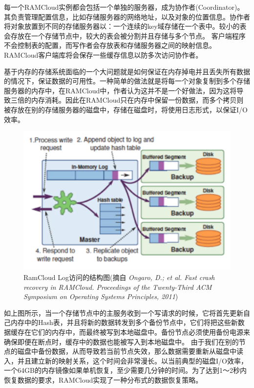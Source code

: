 每一个RAMCloud实例都会包括一个单独的服务器，成为协作者(Coordinator)。其负责管理配置信息，比如存储服务器的网络地址，以及对象的位置信息。协作者将对象放置到不同的存储服务器以：一个连续的key域存储在一个表中。较小的表会存放在一个存储节点中，较大的表会被分割并且存储与多个节点。 客户端程序不会控制表的配置，而写作者会存放表和存储服务器之间的映射信息。RAMCloud客户端库将会保存一些缓存信息以防多次访问协作者。

  基于内存的存储系统面临的一个大问题就是如何保证在内存掉电并且丢失所有数据的情况下，保证数据的可用性。一种简单的做法就是将每一个对象复制到多个存储服务器的内存中，在RAMCloud中，作者认为这并不是一个好做法，因为这将导致三倍的内存消耗。因此在RAMCloud只在内存中保留一份数据，而多个拷贝则被存放在别的存储服务器的磁盘中，存储在磁盘时，将使用日志形式，以保证I/O效率。

\begin{figure}[]
\centering
\includegraphics[width=4.5in]{../figures/ramcloudlog.pdf}
\caption{RamCloud Log访问的结构图(摘自\textit{
Ongaro, D.; et al. Fast crash recovery in RAMCloud. Proceedings of the Twenty-Third ACM Symposium on Operating Systems Principles, 2011})}
\label{fig:ramcloudlog}
\end{figure}

如上图所示，当一个存储节点中的主服务收到一个写请求的时候，它将首先更新自己内存中的Hash表，并且将新的数据转发到多个备份节点中，它们将把这些新数据缓存在它们的内存中，而最终被写到本地磁盘中。备份节点必须使用备份电源来确保即便在断点时，缓存中的数据也能被写入到本地磁盘中。
  由于我们在别的节点的磁盘中备份数据，从而导致若当前节点失效，那么数据需要重新从磁盘中读入，并且建立新的映射关系，这个时间会非常漫长。以当前典型的磁盘I/O效率，一个64GB的内存镜像如果单机恢复，至少需要几分钟的时间。为了达到1～2秒内恢复数据的要求，RAMCloud实现了一种分布式的数据恢复策略。


